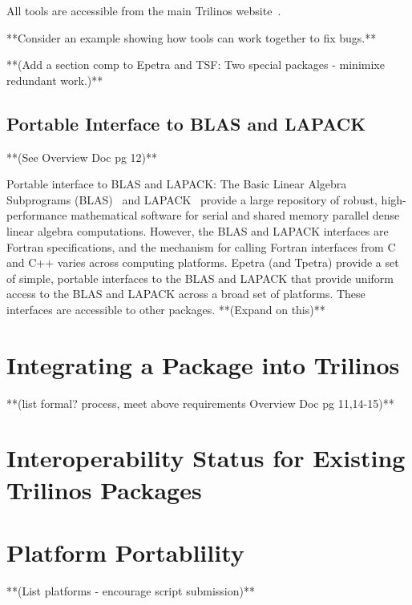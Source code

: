 \documentclass[12pt,relax]{SANDreport}
\begin{document}
All 
tools are accessible from the main Trilinos website~\cite{Trilinos-home-page}.

**Consider an example showing how tools can work together to fix bugs.**

	**(Add a section comp to Epetra and TSF: Two special packages - minimixe redundant work.)**
	\subsection{Portable Interface to BLAS and LAPACK}
	**(See Overview Doc pg 12)**

Portable interface to BLAS and LAPACK: The Basic Linear Algebra
Subprograms (BLAS)~\cite{BLAS1,BLAS2,BLAS3} and LAPACK~\cite{lapack}
provide a large repository of robust, high-performance mathematical
software for serial and shared memory parallel dense linear algebra
computations.  However, the BLAS and LAPACK interfaces are Fortran
specifications, and the mechanism for calling Fortran interfaces from
C and C++ varies across computing platforms.  Epetra (and Tpetra)
provide a set of simple, portable interfaces to the BLAS and LAPACK
that provide uniform access to the BLAS and LAPACK across a broad
set of platforms.  These interfaces are accessible to
other packages.
**(Expand on this)**


	\section{Integrating a Package into Trilinos}
	**(list formal? process, meet above requirements Overview Doc pg 11,14-15)**




	\section{Interoperability Status for Existing Trilinos Packages}

	\section{Platform Portablility}
	**(List platforms - encourage script submission)**
    \clearpage
    
    

\end{document}
